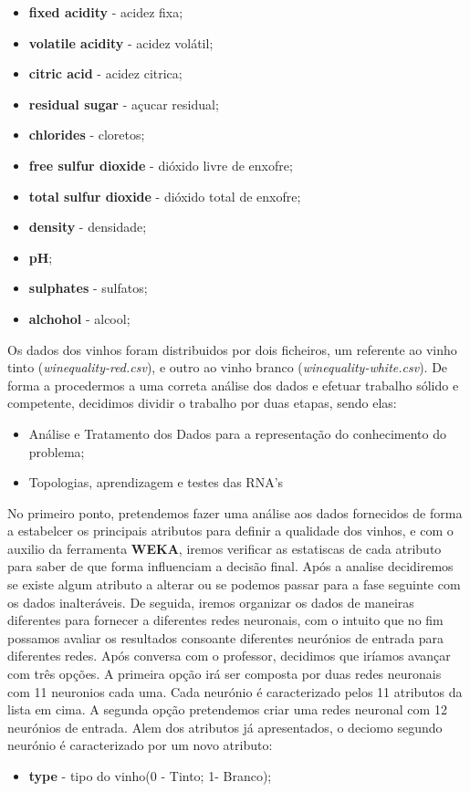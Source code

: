 \documentclass{report}
\begin{document}
\bigbreak
\begin{itemize}
\item{\textbf{fixed acidity} - acidez fixa;} 
\item{\textbf{volatile acidity} - acidez volátil;}
\item{\textbf{citric acid} - acidez citrica;}
\item{\textbf{residual sugar} - açucar residual;}
\item{\textbf{chlorides} - cloretos;}
\item{\textbf{free sulfur dioxide} - dióxido livre de enxofre;}
\item{\textbf{total sulfur dioxide} - dióxido total de enxofre;}
\item{\textbf{density} - densidade;}
\item{\textbf{pH};}
\item{\textbf{sulphates} - sulfatos;}
\item{\textbf{alchohol} - alcool;} 
\end{itemize}
\bigbreak

Os dados dos vinhos foram distribuidos por dois ficheiros, um referente ao vinho tinto (\textit{winequality-red.csv}), e outro ao vinho branco (\textit{winequality-white.csv}).
De forma a procedermos a uma correta análise dos dados e efetuar trabalho sólido e competente, decidimos dividir o trabalho por duas etapas, sendo elas:

\bigbreak
\begin{itemize}
\item{Análise e Tratamento dos Dados para a representação do conhecimento do problema;}
\item{Topologias, aprendizagem e testes das RNA's}
\end{itemize}
\bigbreak

No primeiro ponto, pretendemos fazer uma análise aos dados fornecidos de forma a estabelcer os principais atributos para definir a qualidade dos vinhos, e com o auxilio da ferramenta \textbf{WEKA}, iremos verificar as estatiscas de cada atributo para saber de que forma influenciam a decisão final. Após a analise decidiremos se existe algum atributo a alterar ou se podemos passar para a fase seguinte com os dados inalteráveis.
De seguida, iremos organizar os dados de maneiras diferentes para fornecer a diferentes redes neuronais, com o intuito que no fim possamos avaliar os resultados consoante diferentes neurónios de entrada para diferentes redes. Após conversa com o professor, decidimos que iríamos avançar com três opções.
A primeira opção irá ser composta por duas redes neuronais com 11 neuronios cada uma. Cada neurónio é caracterizado pelos 11 atributos da lista em cima.
A segunda opção pretendemos criar uma redes neuronal com 12 neurónios de entrada. Alem dos atributos já apresentados, o deciomo segundo neurónio é caracterizado por um novo atributo:
\bigbreak
\begin{itemize}
\item{\textbf{type} - tipo do vinho(0 - Tinto; 1- Branco);} 
\end{itemize}
\bigbreak
\end{document}
